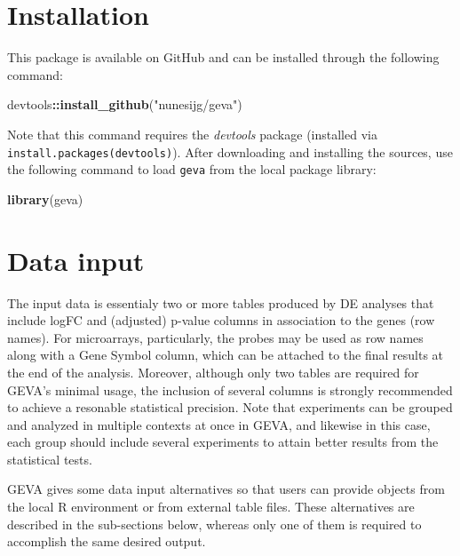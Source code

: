 \documentclass[
  12pt,
]{article}
\newenvironment{Shaded}{\begin{snugshade}}{\end{snugshade}}
\newcommand{\KeywordTok}[1]{\textcolor[rgb]{0.13,0.29,0.53}{\textbf{#1}}}
\newcommand{\NormalTok}[1]{#1}
\newcommand{\OperatorTok}[1]{\textcolor[rgb]{0.81,0.36,0.00}{\textbf{#1}}}
\newcommand{\StringTok}[1]{\textcolor[rgb]{0.31,0.60,0.02}{#1}}
\begin{document}
\hypertarget{installation}{%
\section{Installation}\label{installation}}

This package is available on GitHub and can be installed through the
following command:

\begin{Shaded}
\begin{Highlighting}[]
\NormalTok{devtools}\OperatorTok{::}\KeywordTok{install_github}\NormalTok{(}\StringTok{"nunesijg/geva"}\NormalTok{)}
\end{Highlighting}
\end{Shaded}

Note that this command requires the \emph{devtools} package (installed
via
\texttt{install.packages(\textquotesingle{}devtools\textquotesingle{})}).
After downloading and installing the sources, use the following command
to load \texttt{geva} from the local package library:

\begin{Shaded}
\begin{Highlighting}[]
\KeywordTok{library}\NormalTok{(geva)}
\end{Highlighting}
\end{Shaded}

\hypertarget{data-input}{%
\section{Data input}\label{data-input}}

The input data is essentialy two or more tables produced by DE analyses
that include logFC and (adjusted) p-value columns in association to the
genes (row names). For microarrays, particularly, the probes may be used
as row names along with a Gene Symbol column, which can be attached to
the final results at the end of the analysis. Moreover, although only
two tables are required for GEVA's minimal usage, the inclusion of
several columns is strongly recommended to achieve a resonable
statistical precision. Note that experiments can be grouped and analyzed
in multiple contexts at once in GEVA, and likewise in this case, each
group should include several experiments to attain better results from
the statistical tests.

GEVA gives some data input alternatives so that users can provide
objects from the local R environment or from external table files. These
alternatives are described in the sub-sections below, whereas only one
of them is required to accomplish the same desired output.
\end{document}

